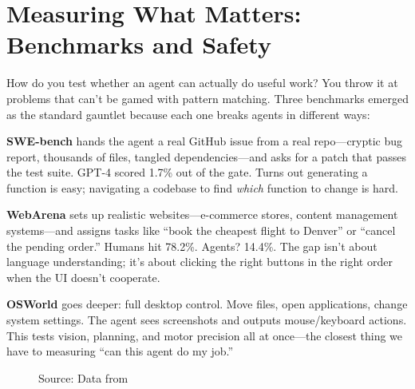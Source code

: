 \documentclass[12pt,a4paper]{report}
\theoremstyle{definition}
\newcommand{\source}[1]{\vspace{-0.5\baselineskip}\caption*{\small Source: #1}}
\begin{document}
\section{Measuring What Matters: Benchmarks and Safety}
\label{sec:eval_safety}

How do you test whether an agent can actually do useful work? You throw it at problems that can't be gamed with pattern matching. Three benchmarks emerged as the standard gauntlet because each one breaks agents in different ways:

\textbf{SWE-bench} \cite{jimenez2024swebench} hands the agent a real GitHub issue from a real repo---cryptic bug report, thousands of files, tangled dependencies---and asks for a patch that passes the test suite. GPT-4 scored 1.7\% out of the gate. Turns out generating a function is easy; navigating a codebase to find \textit{which} function to change is hard.

\textbf{WebArena} \cite{zhou2024webarena} sets up realistic websites---e-commerce stores, content management systems---and assigns tasks like ``book the cheapest flight to Denver'' or ``cancel the pending order.'' Humans hit 78.2\%. Agents? 14.4\%. The gap isn't about language understanding; it's about clicking the right buttons in the right order when the UI doesn't cooperate.

\textbf{OSWorld} \cite{xie2024osworld} goes deeper: full desktop control. Move files, open applications, change system settings. The agent sees screenshots and outputs mouse/keyboard actions. This tests vision, planning, and motor precision all at once---the closest thing we have to measuring ``can this agent do my job.''

\begin{figure}[htbp]
\centering
{}
\caption{Performance gap between GPT-4 and humans on agentic benchmarks. \textbf{SWE-bench} tests code repair on real GitHub issues; \textbf{WebArena} checks web navigation (booking, shopping); \textbf{OSWorld} evaluates desktop automation requiring vision and control. SWE-bench has no published human baseline, so no human bar is shown. The large gap (GPT-4/GPT-4V at 1.7--14.4\% vs.\ humans at 72--78\% where measured) shows how hard autonomous multi-step execution is and motivates RL-based fine-tuning.}
\label{fig:benchmark_comparison}
\source{Data from ~\cite{jimenez2024swebench,zhou2024webarena,xie2024osworld}}
\end{figure}
\end{document}
